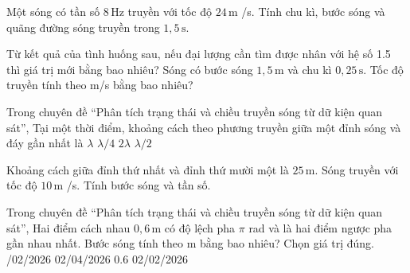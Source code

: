 \begin{ex}
Một sóng có tần số $8\,\text{Hz}$ truyền với tốc độ $24\,\text{m}$ /s. Tính chu kì, bước sóng và quãng đường sóng truyền trong $1,5\,\text{s}$.
\choiceTF

\end{ex}

\begin{ex}
Từ kết quả của tình huống sau, nếu đại lượng cần tìm được nhân với hệ số 1.5 thì giá trị mới bằng bao nhiêu? Sóng có bước sóng $1,5\,\text{m}$ và chu kì $0,25\,\text{s}$. Tốc độ truyền tính theo m/s bằng bao nhiêu?
\end{ex}

\begin{ex}
Trong chuyên đề “Phân tích trạng thái và chiều truyền sóng từ dữ kiện quan sát”, Tại một thời điểm, khoảng cách theo phương truyền giữa một đỉnh sóng và đáy gần nhất là
\choice
{$\lambda$}
{$\lambda/4$}
{$2\lambda$}
{\True $\lambda/2$}
\end{ex}

\begin{ex}
Khoảng cách giữa đỉnh thứ nhất và đỉnh thứ mười một là $25\,\text{m}$. Sóng truyền với tốc độ $10\,\text{m}$ /s. Tính bước sóng và tần số.
\choiceTF

\end{ex}

\begin{ex}
Trong chuyên đề “Phân tích trạng thái và chiều truyền sóng từ dữ kiện quan sát”, Hai điểm cách nhau $0,6\,\text{m}$ có độ lệch pha $\pi$ rad và là hai điểm ngược pha gần nhau nhất. Bước sóng tính theo m bằng bao nhiêu? Chọn giá trị đúng.
\choice
{/02/2026}
{02/04/2026}
{0.6}
{02/02/2026}
\end{ex}

